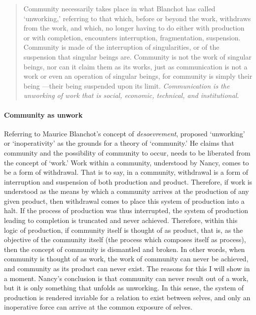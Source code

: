 \begin{quote}
	Community necessarily takes place in what Blanchot has called `unworking,' referring to that which, before or beyond the work, withdraws from the work, and which, no longer having to do either with production or with completion, encounters interruption, fragmentation, suspension. Community is made of the interruption of singularities, or of the suspension that singular beings are. Community is not the work of singular beings, nor can it claim them as its works, just as communication is not a work or even an operation of singular beings, for community is simply their being ---their being suspended upon its limit. \textit{Communication is the unworking of work that is social, economic, technical, and institutional}. \im \parencite[31]{Nan91:The} 
\end{quote} %

% 
% 
% 
% 
% 

\paragraph{Community as unwork}
Referring to Maurice Blanchot's concept of \textit{desoevrement}, \textcite{Nan91:The} proposed `unworking' or `inoperativity' as the grounds for a theory of `community.' He claims that community and the possibility of community to occur, needs to be liberated from the concept of `work.' Work within a community, understood by Nancy, comes to be a form of withdrawal. That is to say, in a community, withdrawal is a form of interruption and suspension of both production and product. Therefore, if work is understood as the means by which a community arrives at the production of any given product, then withdrawal comes to place this system of production into a halt. If the process of production was thus interrupted, the system of production leading to completion is truncated and never achieved. Therefore, within this logic of production, if community itself is thought of as product, that is, as the objective of the community itself (the process which composes itself as process), then the concept of community is dismantled and broken. In other words, when community is thought of as work, the work of community can never be achieved, and community as its product can never exist. The reasons for this I will show in a moment. Nancy's conclusion is that community can never result out of a work, but it is only something that unfolds as unworking. In this sense, the system of production is rendered inviable for a relation to exist between selves, and only an inoperative force can arrive at the common exposure of selves.

